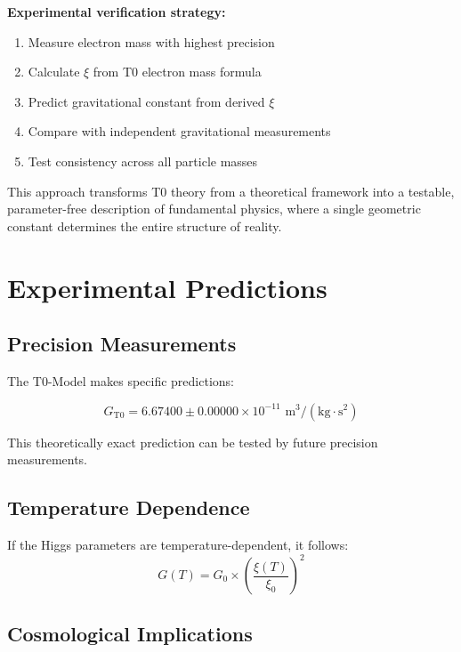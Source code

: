\documentclass[12pt,a4paper]{article}
\theoremstyle{definition}
\begin{document}
\begin{experiment}
	\textbf{Experimental verification strategy:}
	\begin{enumerate}
		\item Measure electron mass with highest precision
		\item Calculate $\xi$ from T0 electron mass formula
		\item Predict gravitational constant from derived $\xi$
		\item Compare with independent gravitational measurements
		\item Test consistency across all particle masses
	\end{enumerate}
\end{experiment}

This approach transforms T0 theory from a theoretical framework into a testable, parameter-free description of fundamental physics, where a single geometric constant determines the entire structure of reality.
\section{Experimental Predictions}

\subsection{Precision Measurements}

The T0-Model makes specific predictions:

\begin{equation}
	G_{\text{T0}} = 6.67400 \pm 0.00000 \times 10^{-11} \text{ m}^3/(\text{kg} \cdot \text{s}^2)
\end{equation}

This theoretically exact prediction can be tested by future precision measurements.

\subsection{Temperature Dependence}

If the Higgs parameters are temperature-dependent, it follows:
\begin{equation}
	G(T) = G_0 \times \left(\frac{\xi(T)}{\xi_0}\right)^2
\end{equation}

\subsection{Cosmological Implications}
\end{document}
